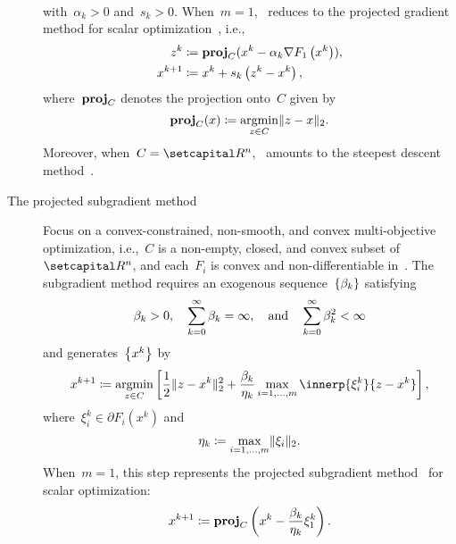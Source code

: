 \documentclass[../../main]{subfiles}
\begin{document}
\begin{example}
\begin{description}
\begin{equation}
\begin{aligned}
                \end{aligned}
            \end{equation}
            with~$\alpha_k > 0$ and~$s_k > 0$.
            When~$m = 1$,~ reduces to the projected gradient method for scalar optimization~\cite{Polyak1963,Goldstein1964,Goldstein1967,McCormick1969}, i.e.,
            \begin{equation}
                \begin{aligned}
                    z^k       & \coloneqq \proj_C (x^k - \alpha_k \nabla F_1\left(x^k\right)), \\
                    x^{k + 1} & \coloneqq x^k + s_k \left( z^k - x^k \right)
                    ,\end{aligned}
            \end{equation}
            where~$\proj_C$ denotes the projection onto~$C$ given by
            \begin{equation} \label{eq:proj}
                \proj_C(x) \coloneqq \argmin_{z \in C} \norm{z - x}_2
                .\end{equation}
            Moreover, when~$C = \setR^n$,~ amounts to the steepest descent method~.
        \item[The projected subgradient method~\cite{Bello-Cruz2013}]
            Focus on a convex-constrained, non-smooth, and convex multi-objective optimization, i.e.,~$C$ is a non-empty, closed, and convex subset of~$\setR^n$, and each~$F_i$ is convex and non-differentiable in~.
            The subgradient method requires an exogenous sequence~$\set{\beta_k}$ satisfying
            \begin{equation}
                \beta_k > 0, \quad \sum_{k = 0}^{\infty} \beta_k = \infty, \eqand \sum_{k = 0}^{\infty} \beta_k^2 < \infty
            \end{equation}
            and generates~$\set*{x^k}$ by
            \begin{equation}
                x^{k + 1} \coloneqq \argmin_{z \in C} \left[ \frac{1}{2} \norm{z - x^k}_2^2 + \frac{\beta_k}{\eta_k} \max_{i = 1, \dots, m} \innerp{\xi^k_i}{z - x^k} \right]
                ,\end{equation}
            where~$\xi^k_i \in \partial F_i\left(x^k\right)$ and
            \begin{equation}
                \eta_k \coloneqq \max_{i = 1, \dots, m} \norm{\xi_i}_2
                .\end{equation}
            When~$m = 1$, this step represents the projected subgradient method~\cite{Polyak1967,Polyak1969,Shor1985,Alber1998,Alber2001} for scalar optimization:
            \begin{equation}
                x^{k + 1} \coloneqq \proj_C\left( x^k - \frac{\beta_k}{\eta_k} \xi^k_1 \right)
                .\end{equation}
    \end{description}
\end{example}
\end{document}
